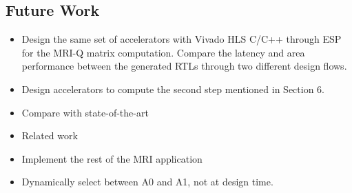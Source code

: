 \subsection{Future Work}
\begin{itemize}

\item Design the same set of accelerators with Vivado HLS C/C++ through ESP for
  the MRI-Q matrix computation. Compare the latency and area performance between
  the generated RTLs through two different design flows.

\item Design accelerators to compute the second step mentioned in Section 6.

\item Compare with state-of-the-art

\item Related work

\item Implement the rest of the MRI application

\item Dynamically select between A0 and A1, not at design time.
  
\end{itemize}
